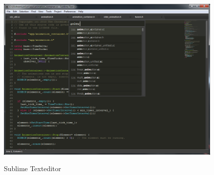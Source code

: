 \begin{figure}[hbt]
\centering
\begin{minipage}[t]{1\textwidth} %
\caption{Sublime Texteditor} %
\includegraphics[width=1\textwidth]{img/sublime.png}\\ %
\end{minipage}
\end{figure}